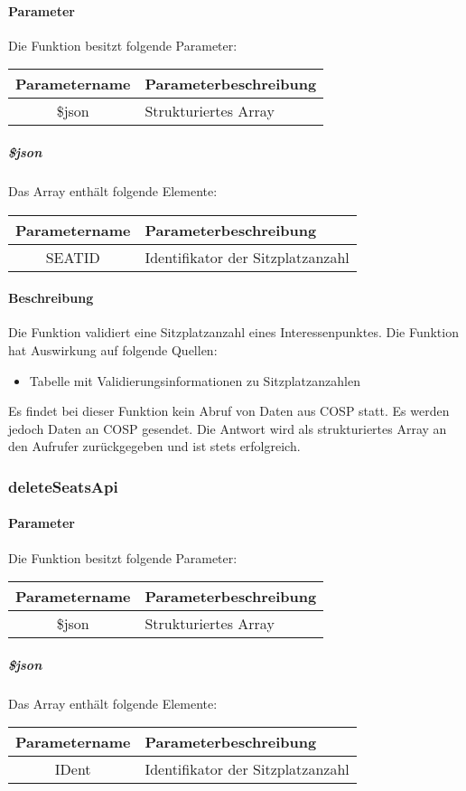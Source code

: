 \paragraph{Parameter} Die Funktion besitzt folgende Parameter:
\begin{table}[H]
	\begin{tabular}{|c|p{11cm}|}
		\hline
		\textbf{Parametername} & \textbf{Parameterbeschreibung} \\ \hline
		\$json & Strukturiertes Array \\ \hline
	\end{tabular}
\end{table}
\subparagraph{\$json}Das Array enthält folgende Elemente:
\begin{table}[H]
	\begin{tabular}{|c|p{11cm}|}
		\hline
		\textbf{Parametername} & \textbf{Parameterbeschreibung} \\ \hline
		SEATID   & Identifikator der Sitzplatzanzahl \\ \hline
	\end{tabular}
\end{table}
\paragraph{Beschreibung} Die Funktion validiert eine Sitzplatzanzahl eines Interessenpunktes. Die Funktion hat Auswirkung auf folgende Quellen:
\begin{itemize}
	\item Tabelle mit Validierungsinformationen zu Sitzplatzanzahlen
\end{itemize}
Es findet bei dieser Funktion kein Abruf von Daten aus {\glqq COSP\grqq} statt. Es werden jedoch Daten an {\glqq COSP\grqq} gesendet. Die Antwort wird als strukturiertes Array an den Aufrufer zurückgegeben und ist stets erfolgreich.
\subsubsection{deleteSeatsApi}
\paragraph{Parameter} Die Funktion besitzt folgende Parameter:
\begin{table}[H]
	\begin{tabular}{|c|p{11cm}|}
		\hline
		\textbf{Parametername} & \textbf{Parameterbeschreibung} \\ \hline
		\$json & Strukturiertes Array \\ \hline
	\end{tabular}
\end{table}
\subparagraph{\$json}Das Array enthält folgende Elemente:
\begin{table}[H]
	\begin{tabular}{|c|p{11cm}|}
		\hline
		\textbf{Parametername} & \textbf{Parameterbeschreibung} \\ \hline
		IDent    & Identifikator der Sitzplatzanzahl \\ \hline
	\end{tabular}
\end{table}

